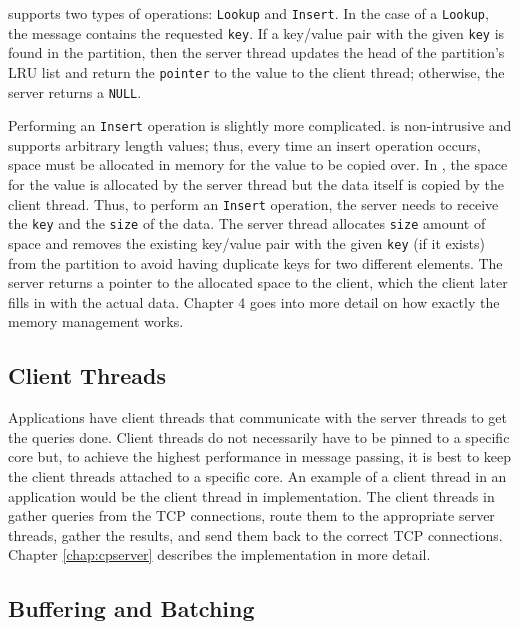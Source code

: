 \cphash{} supports two types of operations: \texttt{Lookup} and \texttt{Insert}. 
In the case of a \texttt{Lookup}, the message contains the requested \texttt{key}. If a key/value pair with the given 
\texttt{key} is found in the partition, then the server thread updates the head of the partition's LRU list and return the \texttt{pointer} to the 
value to the client thread; otherwise, the server returns a \texttt{NULL}.

Performing an \texttt{Insert} operation is slightly more complicated. \cphash{} is non-intrusive and 
supports arbitrary length values; thus, every time an insert operation occurs, space must be allocated 
in memory for the value to be copied over. In \cphash{}, the space for the value is allocated by the server 
thread but the data itself is copied by the client thread. Thus, to perform an \texttt{Insert} operation, the server needs 
to receive the \texttt{key} and the \texttt{size} of the data. The server thread allocates \texttt{size} amount of space and removes the existing 
key/value pair with the given \texttt{key} (if it exists) from the partition to avoid having duplicate keys for two different 
elements. The server returns a pointer to the allocated space to the client, which the client later fills in with the
actual data. Chapter 4 goes into more detail on how exactly the memory management works. 
  
\subsection{Client Threads}
\label{sec:clientthreads}

Applications have client threads that communicate with the server threads to get the queries done. 
Client threads do not necessarily have to be pinned to a specific core but, to achieve the highest performance 
in message passing, it is best to keep the client threads attached to a specific core. An example of a client 
thread in an application would be the client thread in \cpserver{} implementation. The client threads in \cpserver{} 
gather queries from the TCP connections, route them to the appropriate server threads, gather the results, and 
send them back to the correct TCP connections. Chapter \ref{chap:cpserver} describes the \cpserver{} implementation
in more detail.

\subsection{Buffering and Batching}
\label{sec:msgpassing}

